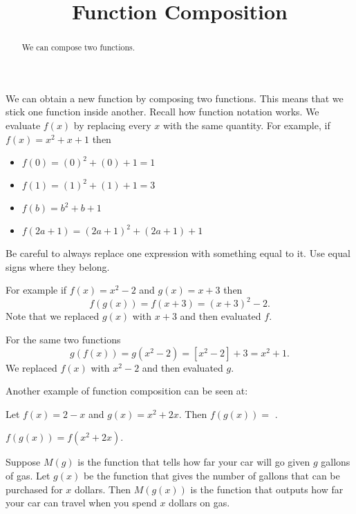 \documentclass{ximera}
\title{Function Composition}
\begin{document}
\begin{abstract}
We can compose two functions.
\end{abstract}
\maketitle


We can obtain a new function by composing two functions. This means that we stick one function inside another. Recall how function notation works. We evaluate $f(x)$ by replacing every $x$ with the same quantity. For example, if $f(x)=x^2+x+1$ then 
\begin{itemize}
\item $f(0)=(0)^2+(0)+1=1$
\item $f(1)=(1)^2+(1)+1=3$
\item $f(b)=b^2+b+1$
\item $f(2a+1)=(2a+1)^2+(2a+1)+1$
\end{itemize}

Be careful to always replace one expression with something equal to it. Use equal signs where they belong.

For example if $f(x)=x^2-2$ and $g(x)=x+3$ then 
\[
f(g(x))=f(x+3)=(x+3)^2-2.
\]
Note that we replaced $g(x)$ with $x+3$ and then evaluated $f$.

For the same two functions
\[
g(f(x))=g(x^2-2)=[x^2-2]+3=x^2+1.
\]
We replaced $f(x)$ with $x^2-2$ and then evaluated $g$.

Another example of function composition can be seen at: 

\begin{question}
Let $f(x)=2-x$ and $g(x)=x^2+2x$. Then
$f(g(x))=$ .

\begin{hint}
$f(g(x))=f(x^2+2x)$.
\end{hint}

\end{question}

Suppose $M(g)$ is the function that tells how far your car will go given $g$ gallons of gas. Let $g(x)$ be the function that gives the number of gallons that can be purchased for $x$ dollars. Then $M(g(x))$ is the function that outputs how far your car can travel when you spend $x$ dollars on gas. 
\end{document}
